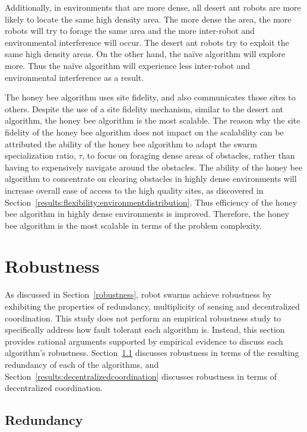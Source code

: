Additionally, in environments that are more dense, all desert ant robots are more likely to locate the same high density area. The more dense the area, the more robots will try to forage the same area and the more inter-robot and environmental interference will occur. The desert ant robots try to exploit the same high density areas. On the other hand, the na\"ive algorithm will explore more. Thus the na\"ive algorithm will experience less inter-robot and environmental interference as a result. 


The honey bee algorithm uses site fidelity, and also communicates those sites to others. Despite the use of a site fidelity mechanism, similar to the desert ant algorithm, the honey bee algorithm is the most scalable. The reason why the site fidelity of the honey bee algorithm does not impact on the scalability can be attributed the ability of the honey bee algorithm to adapt the swarm specialization ratio, $\tau$, to focus on foraging dense areas of obstacles, rather than having to expensively navigate around the obstacles. The ability of the honey bee algorithm to concentrate on clearing obstacles in highly dense environments will increase overall ease of access to the high quality sites, as discovered in Section~\ref{results:flexibility:environmentdistribution}. Thus efficiency of the honey bee algorithm in highly dense environments is improved. Therefore, the honey bee algorithm is the most scalable in terms of the problem complexity.



\section{Robustness}
\label{results:robustness}
As discussed in Section~\ref{robustness}, robot swarms achieve robustness by exhibiting the properties of redundancy, multiplicity of sensing and decentralized coordination. This study does not perform an empirical robustness study to specifically address how fault tolerant each algorithm is. Instead, this section provides rational arguments supported by empirical evidence to discuss each algorithm's robustness. Section~\ref{results:redundancy} discusses robustness in terms of the resulting redundancy of each of the algorithms, and Section~\ref{results:decentralizedcoordination} discusses robustness in terms of decentralized coordination.

\subsection{Redundancy}
\label{results:redundancy}

